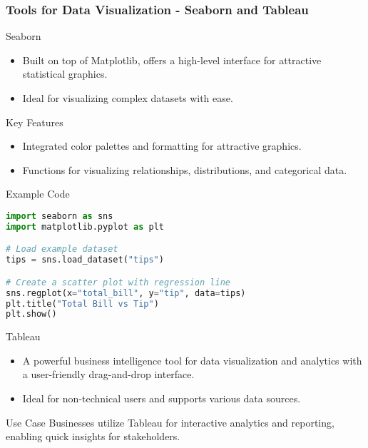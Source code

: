 \documentclass[aspectratio=169]{beamer}
\begin{document}
\begin{frame}[fragile]
    \frametitle{Tools for Data Visualization - Seaborn and Tableau}
    \begin{block}{Seaborn}
        \begin{itemize}
            \item Built on top of Matplotlib, offers a high-level interface for attractive statistical graphics.
            \item Ideal for visualizing complex datasets with ease.
        \end{itemize}

        \begin{block}{Key Features}
            \begin{itemize}
                \item Integrated color palettes and formatting for attractive graphics.
                \item Functions for visualizing relationships, distributions, and categorical data.
            \end{itemize}
        \end{block}

        \begin{block}{Example Code}
            \begin{lstlisting}[language=Python]
import seaborn as sns
import matplotlib.pyplot as plt

# Load example dataset
tips = sns.load_dataset("tips")

# Create a scatter plot with regression line
sns.regplot(x="total_bill", y="tip", data=tips)
plt.title("Total Bill vs Tip")
plt.show()
            \end{lstlisting}
        \end{block}
    \end{block}

    \begin{block}{Tableau}
        \begin{itemize}
            \item A powerful business intelligence tool for data visualization and analytics with a user-friendly drag-and-drop interface.
            \item Ideal for non-technical users and supports various data sources.
        \end{itemize}

        \begin{block}{Use Case}
            Businesses utilize Tableau for interactive analytics and reporting, enabling quick insights for stakeholders.
        \end{block}
    \end{block}
\end{frame}
\end{document}
